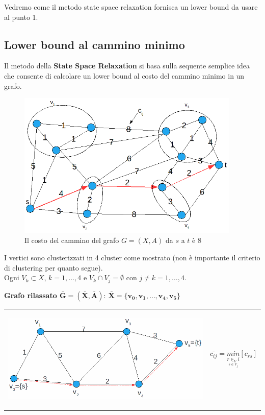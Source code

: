 Vedremo come il metodo state space relaxation fornisca un lower bound da usare al punto 1.

\subsection{Lower bound al cammino minimo}
Il metodo della \textbf{State Space Relaxation} si basa sulla sequente semplice idea che consente di calcolare un lower bound al costo del cammino minimo in un grafo.
\begin{figure}[!h]
	\centering
	\includegraphics[height=7cm]{images/graph42.png}
	\caption{Il costo del cammino del grafo $G=(X,A)$ da $s$ a $t$ è 8}
\end{figure}

I vertici sono clusterizzati in 4 cluster come mostrato (non è importante il criterio di clustering per quanto segue).\\
Ogni $V_{k}\subset X$, $k=1,\dots,4$ e $V_{k}\cap V_{j}=\emptyset$ con $j\neq k=1,\dots,4$.

\clearpage
\textbf{Grafo rilassato $\boldsymbol{\bar{G}=(\bar{X},\bar{A}):\ \bar{X}=\{v_{0},v_{1},\dots,v_{4},v_{5}\}}$}
\begin{table}[!h]
	\begin{tabular}{m{11cm} m{5cm}}
		\includegraphics[height=5cm]{images/graph43.png} & \begin{equation*}
			\bar{c_{ij}}=\underset{\underset{s\in V_{j}}{r\in _V{i}}}{min}[c_{rs}]
		\end{equation*}
	\end{tabular}
\end{table}

